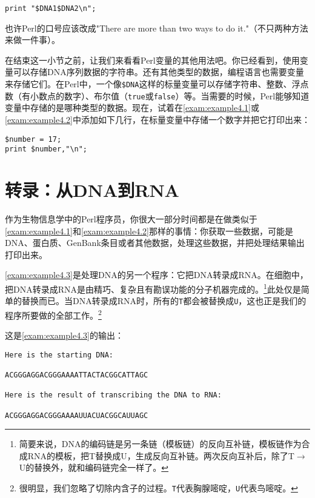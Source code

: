 \begin{lstlisting}
print "$DNA1$DNA2\n";
\end{lstlisting}

也许Perl的口号应该改成"There are more than two ways to do it."（不只两种方法来做一件事）。

在结束这一小节之前，让我们来看看Perl变量的其他用法吧。你已经看到，使用变量可以存储DNA序列数据的字符串。还有其他类型的数据，编程语言也需要变量来存储它们。在Perl中，一个像\verb|$DNA|这样的标量变量可以存储字符串、整数、浮点数（有小数点的数字）、布尔值（\verb|true|或\verb|false|）等。当需要的时候，Perl能够知道变量中存储的是哪种类型的数据。现在，试着在\autoref{exam:example4.1}或\autoref{exam:example4.2}中添加如下几行，在标量变量中存储一个数字并把它打印出来：

\begin{lstlisting}
$number = 17;
print $number,"\n";
\end{lstlisting}

\section{转录：从DNA到RNA}
作为生物信息学中的Perl程序员，你很大一部分时间都是在做类似于\autoref{exam:example4.1}和\autoref{exam:example4.2}那样的事情：你获取一些数据，可能是DNA、蛋白质、GenBank条目或者其他数据，处理这些数据，并把处理结果输出打印出来。

\autoref{exam:example4.3}是处理DNA的另一个程序：它把DNA转录成RNA。在细胞中，把DNA转录成RNA是由精巧、复杂且有勘误功能的分子机器完成的。\footnote{简要来说，DNA的编码链是另一条链（模板链）的反向互补链，模板链作为合成RNA的模板，把T替换成U，生成反向互补链。两次反向互补后，除了T$\rightarrow$U的替换外，就和编码链完全一样了。}此处仅是简单的替换而已。当DNA转录成RNA时，所有的\verb|T|都会被替换成\verb|U|，这也正是我们的程序所要做的全部工作。\footnote{很明显，我们忽略了切除内含子的过程。\verb|T|代表胸腺嘧啶，\verb|U|代表鸟嘧啶。}



这是\autoref{exam:example4.3}的输出：

\begin{lstlisting}
Here is the starting DNA:

ACGGGAGGACGGGAAAATTACTACGGCATTAGC

Here is the result of transcribing the DNA to RNA:

ACGGGAGGACGGGAAAAUUACUACGGCAUUAGC
\end{lstlisting}

